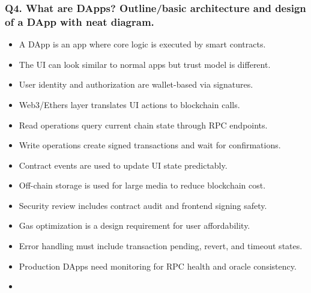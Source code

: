\documentclass[12pt,a4paper]{article}
\begin{document}
\subsubsection*{Q4. What are DApps? Outline/basic architecture and design of a DApp with neat diagram.}
\begin{itemize}
\item A DApp is an app where core logic is executed by smart contracts.
\item The UI can look similar to normal apps but trust model is different.
\item User identity and authorization are wallet-based via signatures.
\item Web3/Ethers layer translates UI actions to blockchain calls.
\item Read operations query current chain state through RPC endpoints.
\item Write operations create signed transactions and wait for confirmations.
\item Contract events are used to update UI state predictably.
\item Off-chain storage is used for large media to reduce blockchain cost.
\item Security review includes contract audit and frontend signing safety.
\item Gas optimization is a design requirement for user affordability.
\item Error handling must include transaction pending, revert, and timeout states.
\item Production DApps need monitoring for RPC health and oracle consistency.
\item[]
\vspace{0.25em}
\noindent{}
\end{itemize}
\end{document}
